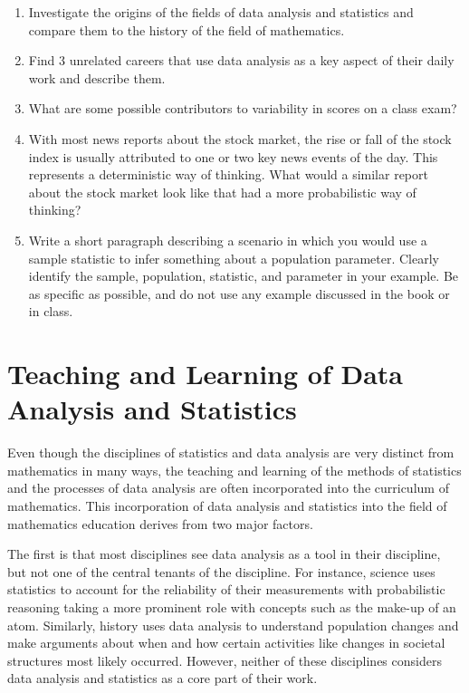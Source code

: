 \documentclass[
]{book}
\theoremstyle{definition}
\theoremstyle{definition}
\theoremstyle{definition}
\theoremstyle{definition}
\theoremstyle{remark}
\begin{document}
\begin{enumerate}
\def\labelenumi{\arabic{enumi}.}
\item
  Investigate the origins of the fields of data analysis and statistics and compare them to the history of the field of mathematics.
\item
  Find 3 unrelated careers that use data analysis as a key aspect of their daily work and describe them.
\item
  What are some possible contributors to variability in scores on a class exam?
\item
  With most news reports about the stock market, the rise or fall of the stock index is usually attributed to one or two key news events of the day. This represents a deterministic way of thinking. What would a similar report about the stock market look like that had a more probabilistic way of thinking?
\item
  Write a short paragraph describing a scenario in which you would use a sample statistic to infer something about a population parameter. Clearly identify the sample, population, statistic, and parameter in your example. Be as specific as possible, and do not use any example discussed in the book or in class.
\end{enumerate}

\hypertarget{teaching-and-learning-of-data-analysis-and-statistics}{%
\section{Teaching and Learning of Data Analysis and Statistics}\label{teaching-and-learning-of-data-analysis-and-statistics}}

Even though the disciplines of statistics and data analysis are very distinct from mathematics in many ways, the teaching and learning of the methods of statistics and the processes of data analysis are often incorporated into the curriculum of mathematics. This incorporation of data analysis and statistics into the field of mathematics education derives from two major factors.

The first is that most disciplines see data analysis as a tool in their discipline, but not one of the central tenants of the discipline. For instance, science uses statistics to account for the reliability of their measurements with probabilistic reasoning taking a more prominent role with concepts such as the make-up of an atom. Similarly, history uses data analysis to understand population changes and make arguments about when and how certain activities like changes in societal structures most likely occurred. However, neither of these disciplines considers data analysis and statistics as a core part of their work.
\end{document}
